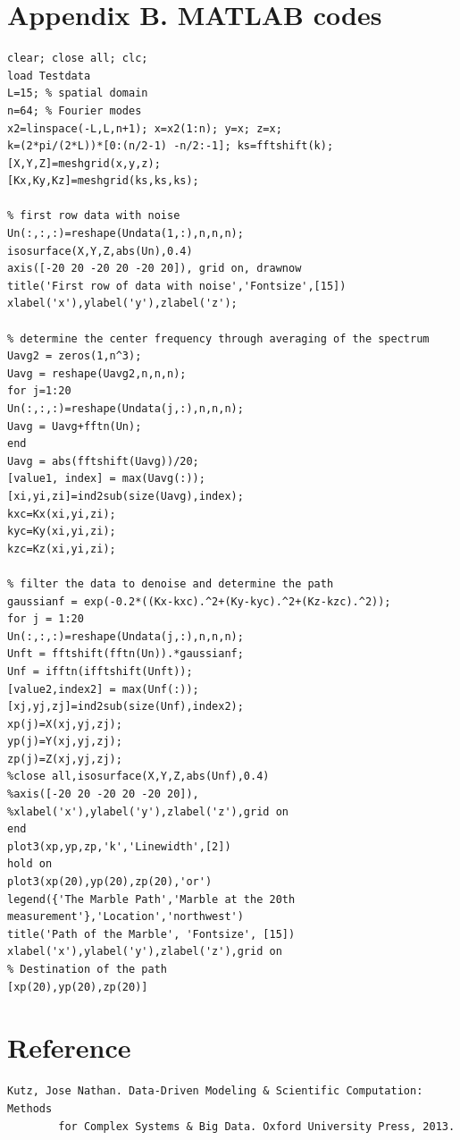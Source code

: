 \documentclass[12pt,letterpaper]{article}
\begin{document}
\section*{Appendix B. MATLAB codes}
\begin{verbatim}
clear; close all; clc;
load Testdata
L=15; % spatial domain
n=64; % Fourier modes
x2=linspace(-L,L,n+1); x=x2(1:n); y=x; z=x;
k=(2*pi/(2*L))*[0:(n/2-1) -n/2:-1]; ks=fftshift(k);
[X,Y,Z]=meshgrid(x,y,z);
[Kx,Ky,Kz]=meshgrid(ks,ks,ks);

% first row data with noise
Un(:,:,:)=reshape(Undata(1,:),n,n,n);
isosurface(X,Y,Z,abs(Un),0.4)
axis([-20 20 -20 20 -20 20]), grid on, drawnow
title('First row of data with noise','Fontsize',[15])
xlabel('x'),ylabel('y'),zlabel('z');

% determine the center frequency through averaging of the spectrum
Uavg2 = zeros(1,n^3);
Uavg = reshape(Uavg2,n,n,n);
for j=1:20
Un(:,:,:)=reshape(Undata(j,:),n,n,n);
Uavg = Uavg+fftn(Un);
end
Uavg = abs(fftshift(Uavg))/20;
[value1, index] = max(Uavg(:));
[xi,yi,zi]=ind2sub(size(Uavg),index);
kxc=Kx(xi,yi,zi);
kyc=Ky(xi,yi,zi);
kzc=Kz(xi,yi,zi);

% filter the data to denoise and determine the path 
gaussianf = exp(-0.2*((Kx-kxc).^2+(Ky-kyc).^2+(Kz-kzc).^2));
for j = 1:20
Un(:,:,:)=reshape(Undata(j,:),n,n,n);
Unft = fftshift(fftn(Un)).*gaussianf;
Unf = ifftn(ifftshift(Unft));
[value2,index2] = max(Unf(:));
[xj,yj,zj]=ind2sub(size(Unf),index2);
xp(j)=X(xj,yj,zj);
yp(j)=Y(xj,yj,zj);
zp(j)=Z(xj,yj,zj);
%close all,isosurface(X,Y,Z,abs(Unf),0.4)
%axis([-20 20 -20 20 -20 20]),
%xlabel('x'),ylabel('y'),zlabel('z'),grid on
end
plot3(xp,yp,zp,'k','Linewidth',[2])
hold on
plot3(xp(20),yp(20),zp(20),'or')
legend({'The Marble Path','Marble at the 20th measurement'},'Location','northwest')
title('Path of the Marble', 'Fontsize', [15])
xlabel('x'),ylabel('y'),zlabel('z'),grid on
% Destination of the path
[xp(20),yp(20),zp(20)]
\end{verbatim}
\section*{Reference}
\begin{verbatim}
Kutz, Jose Nathan. Data-Driven Modeling & Scientific Computation: Methods 
	    for Complex Systems & Big Data. Oxford University Press, 2013.
\end{verbatim}
\end{document}
